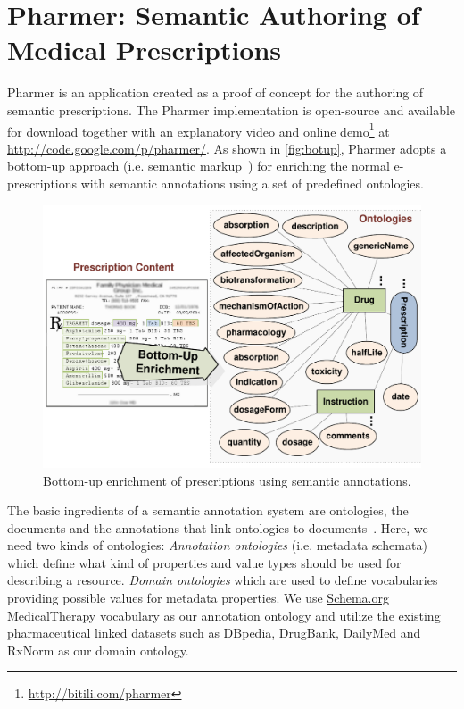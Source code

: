 \documentclass[10pt, conference, compsocconf]{IEEEtran}
\begin{document}
\section{Pharmer: Semantic Authoring of Medical Prescriptions}
\label{sec:pharmer}
Pharmer is an application created as a proof of concept for the authoring of semantic prescriptions.
The Pharmer implementation is open-source and available for download together with an explanatory video and online demo\footnote{\url{http://bitili.com/pharmer}} at \url{http://code.google.com/p/pharmer/}.
As shown in \autoref{fig:botup}, Pharmer adopts a bottom-up approach (i.e. semantic markup~\cite{araujo2010}) for enriching the normal e-prescriptions with semantic annotations using a set of predefined ontologies.

\begin{figure}[tb]
	\centering
		\includegraphics[width=1.0\columnwidth]{images/approaches.pdf}
	\caption{Bottom-up enrichment of prescriptions using semantic annotations.}
	\label{fig:botup}
\end{figure}

The basic ingredients of a semantic annotation system are ontologies, the documents and the annotations that link ontologies to documents~\cite{khalili2012}.
Here, we need two kinds of ontologies:
\emph{Annotation ontologies} (i.e. metadata schemata) which define what kind of properties and value types should be used for describing a resource.
\emph{Domain ontologies} which are used to define vocabularies providing possible values for metadata properties.
We use \url{Schema.org} MedicalTherapy vocabulary as our annotation ontology and utilize the existing pharmaceutical linked datasets such as DBpedia, DrugBank, DailyMed and RxNorm as our domain ontology.
\end{document}
